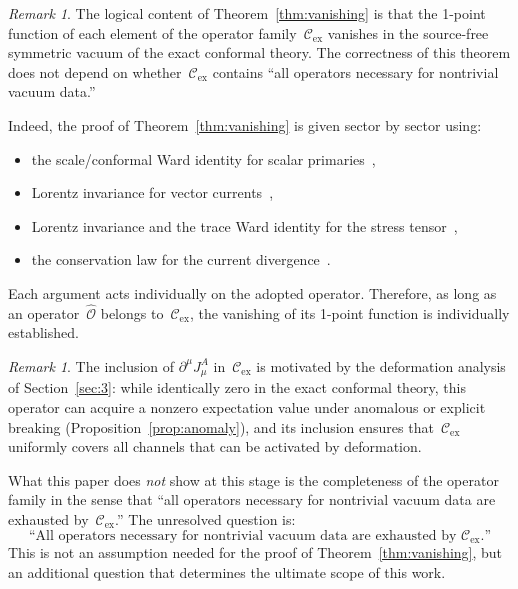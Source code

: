 \documentclass[
  aps,
  prd,
  preprint,
  groupedaddress,
  nofootinbib,
  longbibliography
]{revtex4-2}
\theoremstyle{remark}
\newtheorem{remark}[definition]{Remark}
\newcommand{\Cex}{\mathcal{C}_{\mathrm{ex}}}
\begin{document}
\begin{remark}\label{rem:scope-1}
The logical content of Theorem~\ref{thm:vanishing} is that the
1-point function of each element of the operator family~$\Cex$
vanishes in the source-free symmetric vacuum of the exact conformal
theory.
The correctness of this theorem does not depend on whether~$\Cex$
contains ``all operators necessary for nontrivial vacuum data.''
\end{remark}

Indeed, the proof of Theorem~\ref{thm:vanishing} is given
sector by sector using:
\begin{itemize}
\item the scale/conformal Ward identity for scalar
  primaries~\cite{ref13,ref14},
\item Lorentz invariance for vector
  currents~\cite{ref13,ref14},
\item Lorentz invariance and the trace Ward identity for the
  stress tensor~\cite{ref5,ref13,ref14},
\item the conservation law for the current
  divergence~\cite{ref4,ref6,ref7}.
\end{itemize}
Each argument acts individually on the adopted operator.
Therefore, as long as an operator~$\hat{\mathcal{O}}$ belongs
to~$\Cex$, the vanishing of its 1-point function is individually
established.

\begin{remark}\label{rem:divJ-rationale}
The inclusion of $\partial^\mu J_\mu^A$ in~$\Cex$ is motivated
by the deformation analysis of Section~\ref{sec:3}:
while identically zero in the exact conformal theory,
this operator can acquire a nonzero expectation value under
anomalous or explicit breaking
(Proposition~\ref{prop:anomaly}),
and its inclusion ensures that~$\Cex$ uniformly covers all
channels that can be activated by deformation.
\end{remark}

What this paper does \emph{not} show at this stage is the
completeness of the operator family in the sense that ``all
operators necessary for nontrivial vacuum data are exhausted
by~$\Cex$.''
The unresolved question is:
\begin{equation}\label{eq:completeness-open}
  \text{``All operators necessary for nontrivial vacuum data
  are exhausted by~$\Cex$.''}
\end{equation}
This is not an assumption needed for the proof of
Theorem~\ref{thm:vanishing}, but an additional question that
determines the ultimate scope of this work.
\end{document}
